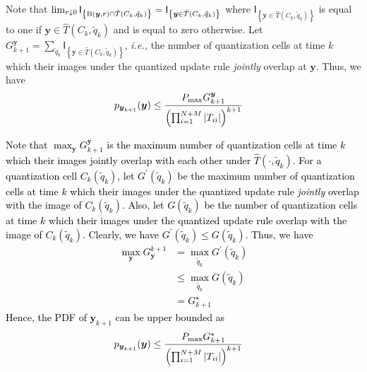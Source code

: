 \documentclass[10pt,twocolumn,twoside]{IEEEtran}
\begin{document}
\begin{IEEEproof}
{Note that $\lim_{r\downarrow0}{\ensuremath{\mathsf{I}_{\left\{{{\rm B}{\left({{\ensuremath{\boldsymbol{{y}}}},r}\right)}\cap {\ensuremath{\hat{T}\left({C_k},{\tilde{q}_k}\right)}}}\right\}}}}={\ensuremath{\mathsf{I}_{\left\{{{\ensuremath{\boldsymbol{{y}}}}\in {\ensuremath{\hat{T}\left({C_k},{\tilde{q}_k}\right)}}}\right\}}}}$ where ${\ensuremath{\mathsf{I}_{\left\{{{\ensuremath{\boldsymbol{{y}}}}\in {\ensuremath{\hat{T}\left({C_k},{\tilde{q}_k}\right)}}}\right\}}}}$ is equal to one  if ${\ensuremath{\boldsymbol{{y}}}}\in {\ensuremath{\hat{T}\left({C_k},{\tilde{q}_k}\right)}}$ and is equal to zero otherwise. Let $G_{k+1}^{{\ensuremath{\boldsymbol{{y}}}}}=\sum_{\tilde{q}_k}{\ensuremath{\mathsf{I}_{\left\{{{\ensuremath{\boldsymbol{{y}}}}\in {\ensuremath{\hat{T}\left({C_k},{\tilde{q}_k}\right)}}}\right\}}}}$, \emph{i.e.,} the number of quantization cells at time $k$ which their images under the quantized update rule \emph{jointly} overlap at ${\ensuremath{\boldsymbol{{y}}}}$. Thus, we have 
\begin{align}\label{}
&p_{{\ensuremath{\boldsymbol{{y}}}}_{k+1}}{\left({{\ensuremath{\boldsymbol{{y}}}}}\right)}\leq \frac{P_{\rm max}G_{k+1}^{{\ensuremath{\boldsymbol{{y}}}}}}{{\left({\prod_{i=1}^{N+M}{\left|{T_{ii}}\right|}}\right)}^{k+1}}
\end{align} }

\textcolor{black}{ Note that $\max_{{\ensuremath{\boldsymbol{{y}}}}}G_{k+1}^{{\ensuremath{\boldsymbol{{y}}}}}$ is the maximum number of quantization cells at time $k$ which their images jointly overlap with each other under ${\ensuremath{\hat{T}\left({\cdot},{\tilde{q}_k}\right)}}$. For a quantization cell $C_k{\left({\tilde{q}_k}\right)}$, let $G^\prime{\left({{\tilde{q}_k}}\right)}$ be the maximum number of quantization cells at time $k$ which their images under  the quantized update rule \emph{jointly} overlap with the image of  $C_k{\left({\tilde{q}_k}\right)}$. Also, let $G{\left({{\tilde{q}_k}}\right)}$ be the number of  quantization cells at time $k$ which their images under  the quantized update rule overlap with the image of  $C_k{\left({\tilde{q}_k}\right)}$. Clearly, we have $G^\prime{\left({{\tilde{q}_k}}\right)}\leq G{\left({{\tilde{q}_k}}\right)}$. Thus, we have 
\begin{align}
\max_{{\ensuremath{\boldsymbol{{y}}}}}G^{k+1}_{{\ensuremath{\boldsymbol{{y}}}}}&= \max_{{\tilde{q}_k}}G^\prime{\left({{\tilde{q}_k}}\right)}\nonumber\\
&\leq\max_{{\tilde{q}_k}}G{\left({{\tilde{q}_k}}\right)}\nonumber\\
&=G^\star_{k+1}
\end{align}
Hence, the PDF of ${\ensuremath{\boldsymbol{{y}}}}_{k+1}$ can be upper bounded as 
\begin{align}
&p_{{\ensuremath{\boldsymbol{{y}}}}_{k+1}}{\left({{\ensuremath{\boldsymbol{{y}}}}}\right)}\leq \frac{P_{\rm max}G_{k+1}^\star}{{\left({\prod_{i=1}^{N+M}{\left|{T_{ii}}\right|}}\right)}^{k+1}}
\end{align} } 
\end{IEEEproof} 
\end{document}
